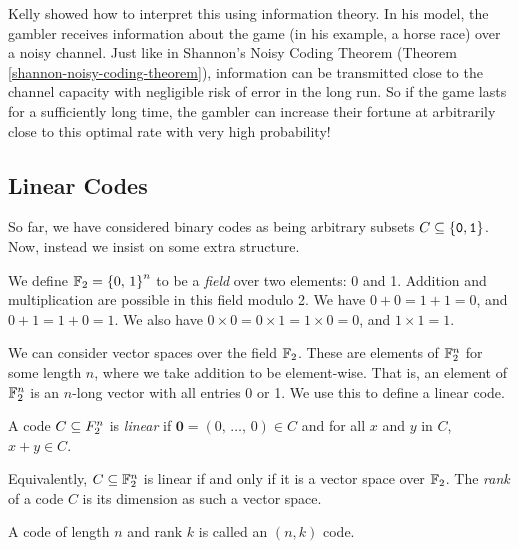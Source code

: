 \documentclass{article}
\begin{document}
Kelly showed how to interpret this using information theory.
In his model, the gambler receives information about the game
(in his example, a horse race) over a noisy channel.
Just like in Shannon's Noisy Coding Theorem
(Theorem \ref{shannon-noisy-coding-theorem}),
information can be transmitted close to the channel capacity
with negligible risk of error in the long run. So if the game lasts for a sufficiently long time, the gambler can increase their fortune at arbitrarily close to this optimal rate with very high probability!



\subsection{Linear Codes}

So far, we have considered binary codes as being arbitrary subsets $C \subseteq \left\lbrace \texttt{0}, \texttt{1} \right\rbrace$.
Now, instead we insist on some extra structure.

\begin{definition}
    We define $\mathbb{F}_2 = \left\lbrace 0, \, 1 \right\rbrace^n$ to be a \textit{field}
    over two elements: 0 and 1.
    Addition and multiplication are possible in this field modulo 2.
    We have $0 + 0 = 1 + 1 = 0$, and $0 + 1 = 1 + 0 = 1$.
    We also have $0 \times 0 = 0 \times 1 = 1 \times 0 = 0$, and $1 \times 1 = 1$.
\end{definition}

We can consider vector spaces over the field $\mathbb{F}_2$.
These are elements of $\mathbb{F}_2^n$ for some length $n$,
where we take addition to be element-wise.
That is, an element of $\mathbb{F}_2^n$ is an $n$-long vector with all entries 0 or 1.
We use this to define a linear code.

\begin{definition}
    A code $C \subseteq F_2^n$ is \textit{linear}
    if $\mathbf{0} = (0, \, \dots, \, 0) \in C$ and
    for all $x$ and $y$ in $C$, $x + y \in C$.
    
    Equivalently, $C \subseteq \mathbb{F}_2^n$ is linear
    if and only if it is a vector space over $\mathbb{F}_2$.
    The \textit{rank} of a code $C$ is its dimension as such a vector space.
\end{definition}

\begin{note}
	A code of length $n$ and rank $k$ is called an $(n, k)$ code.
\end{note}
\end{document}
